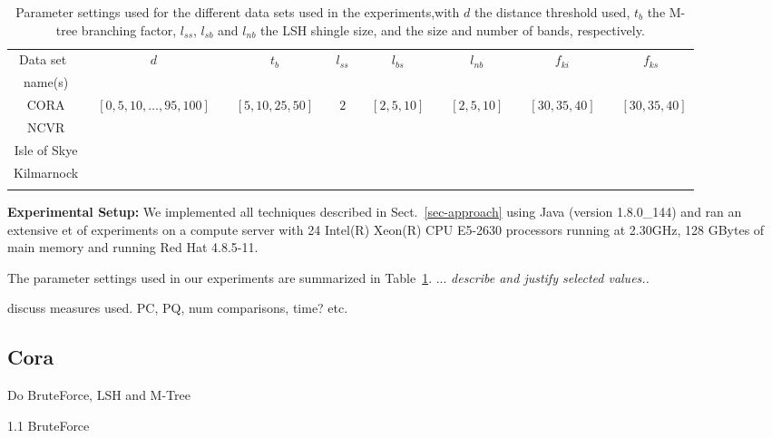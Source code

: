 \documentclass{llncs}
\begin{document}

\begin{table}[t]
\caption{Parameter settings used for the different data sets used in
   the experiments,with $d$ the distance threshold used, $t_b$ the
   M-tree branching factor, $l_{ss}$, $l_{sb}$ and $l_{nb}$ the LSH
   shingle size, and the size and number of bands, respectively.}
 \label{table-parameters}
  \centering
  \begin{scriptsize}
  \begin{tabular}{cccccccc}
  \hline\noalign{\smallskip}
  Data set~ & $d$ & $t_b$ & $l_{ss}$ & $l_{bs}$ & $l_{nb}$ & 
    $f_{ki}$ & $f_{ks}$ \\
  name(s) & & & & & & & \\
  \noalign{\smallskip} \hline \noalign{\smallskip}
  CORA & ~$[0,5,10,\ldots,95,100]$~ & ~$[5,10,25,50]$~ & ~$2$~ &
    ~$[2,5,10]$~ & ~$[2,5,10]$~ & ~$[30,35,40]$~ & ~$[30,35,40]$ \\
  NCVR  &  \\
  Isle of Skye &  \\
  Kilmarnock  &  \\
  \noalign{\smallskip} \hline
  \end{tabular}
  \end{scriptsize}
\end{table}

\smallskip
\textbf{Experimental Setup:}
%
We implemented all techniques described in Sect.~\ref{sec-approach}
using Java (version 1.8.0\_144) and ran an extensive et of experiments on
a compute server with 24 Intel(R) Xeon(R) CPU E5-2630 processors running at 2.30GHz, 
128 GBytes of main memory and running Red Hat 4.8.5-11.

The parameter settings used in our experiments are summarized in
Table~\ref{table-parameters}. ... \emph{describe and justify selected
values..}

discuss measures used. PC, PQ, num comparisons, time? etc.

\subsection{Cora}

Do BruteForce, LSH and M-Tree

1.1 BruteForce



\end{document}
